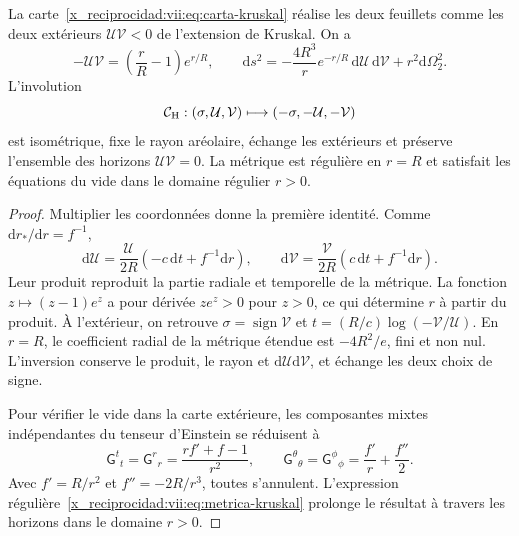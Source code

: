 \begin{theorem}
\label{x_reciprocidad:vii:thm:kruskal-hojas}
La carte~\eqref{x_reciprocidad:vii:eq:carta-kruskal} réalise les deux feuillets comme les deux extérieurs \(\mathcal U\mathcal V<0\) de l'extension de Kruskal. On a
\begin{equation}
 -\mathcal U\mathcal V=\left(\frac rR-1\right)e^{r/R},\qquad
 \mathrm ds^2=-\frac{4R^3}{r}e^{-r/R}\,
                    \mathrm d\mathcal U\,\mathrm d\mathcal V
                    +r^2\mathrm d\Omega_2^2.
 \label{x_reciprocidad:vii:eq:metrica-kruskal}
\end{equation}
L'involution
\begin{equation}
 \mathcal C_{\rm H}:(\sigma,\mathcal U,\mathcal V)
 \longmapsto(-\sigma,-\mathcal U,-\mathcal V)
 \label{x_reciprocidad:vii:eq:involucion-horizonte}
\end{equation}
est isométrique, fixe le rayon aréolaire, échange les extérieurs et préserve
l'ensemble des horizons \(\mathcal U\mathcal V=0\).
La métrique est régulière en \(r=R\) et satisfait les équations du vide
dans le domaine régulier \(r>0\).
\end{theorem}
\begin{proof}
Multiplier les coordonnées donne la première identité. Comme
\(\mathrm dr_*/\mathrm dr=f^{-1}\),
\[
 \mathrm d\mathcal U=\frac{\mathcal U}{2R}
            (-c\,\mathrm dt+f^{-1}\mathrm dr),\qquad
 \mathrm d\mathcal V=\frac{\mathcal V}{2R}
            ( c\,\mathrm dt+f^{-1}\mathrm dr).
\]
Leur produit reproduit la partie radiale et temporelle de la métrique.
La fonction \(z\mapsto(z-1)e^z\) a pour dérivée \(ze^z>0\)
pour \(z>0\), ce qui détermine \(r\) à partir du produit.
À l'extérieur, on retrouve
\(\sigma=\operatorname{sign}\mathcal V\) et
\(t=(R/c)\log(-\mathcal V/\mathcal U)\).
En \(r=R\), le coefficient radial de la métrique étendue est
\(-4R^2/e\), fini et non nul. L'inversion conserve le
produit, le rayon et \(\mathrm d\mathcal U\mathrm d\mathcal V\),
et échange les deux choix de signe.

Pour vérifier le vide dans la carte extérieure, les composantes mixtes indépendantes du tenseur d'Einstein se réduisent à
\[
 \mathsf G^t{}_t=\mathsf G^r{}_r
 =\frac{rf'+f-1}{r^2},\qquad
 \mathsf G^\theta{}_\theta=\mathsf G^\phi{}_\phi
 =\frac{f'}r+\frac{f''}2.
\]
Avec \(f'=R/r^2\) et \(f''=-2R/r^3\), toutes s'annulent. L'expression régulière~\eqref{x_reciprocidad:vii:eq:metrica-kruskal} prolonge le résultat à travers les horizons dans le domaine \(r>0\).
\end{proof}

